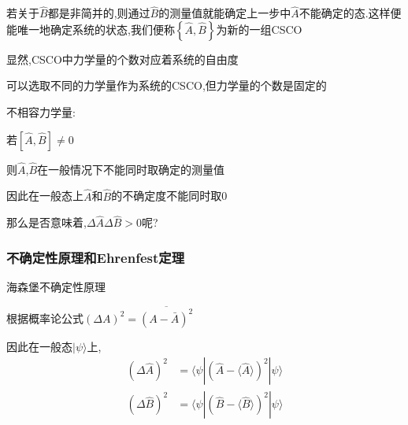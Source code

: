 \documentclass[lang=cn,10pt]{elegantbook}
\begin{document}
	若关于$\hat{B}$都是非简并的,则通过$\hat{B}$的测量值就能确定上一步中$\hat{A}$不能确定的态.这样便能唯一地确定系统的状态,我们便称$ \left\lbrace \hat{A},\hat{B}\right\rbrace $为新的一组CSCO

显然,CSCO中力学量的个数对应着系统的自由度

可以选取不同的力学量作为系统的CSCO,但力学量的个数是固定的

不相容力学量:

若$[ \hat{A} ,\hat{B} ]\ne 0$

则$\hat{A}$,$\hat{B}$在一般情况下不能同时取确定的测量值

	因此在一般态上$\hat{A}$和$\hat{B}$的不确定度不能同时取0

那么是否意味着,$\varDelta\hat{A}\varDelta\hat{B}>0$呢?
	\subsubsection{不确定性原理和Ehrenfest定理}
海森堡不确定性原理

根据概率论公式\quad $(\varDelta A)^2=\overline{(A-\bar{A})^2}$

因此在一般态$|\psi\rangle$上,
\begin{equation*}
	\begin{split}
			\left( \varDelta \hat{A} \right) ^2&=\langle \psi |(\hat{A}-\langle\hat{A}\rangle)^2|\psi \rangle 
		\\
			\left( \varDelta \hat{B} \right) ^2&=\langle \psi |(\hat{B}-\langle\hat{B}\rangle)^2|\psi \rangle 
	\end{split}
\end{equation*}
\end{document}

